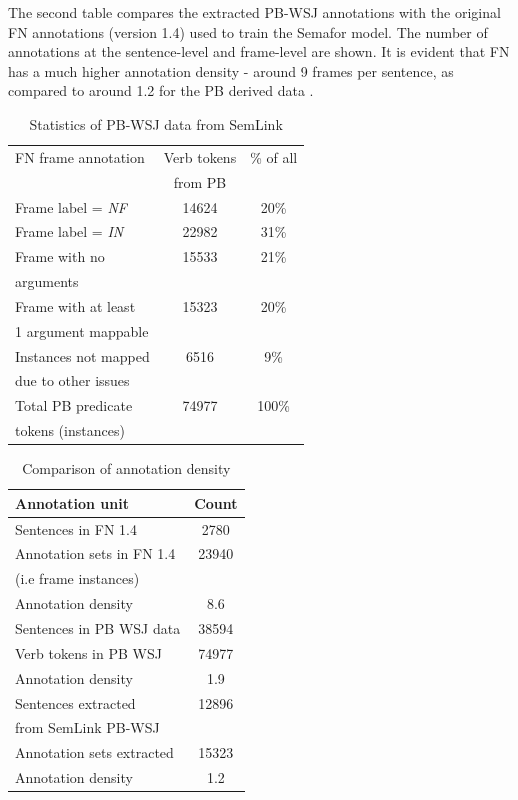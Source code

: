 \documentclass[11pt]{article}
\begin{document}
The second table compares the extracted PB-WSJ annotations with the original FN annotations (version 1.4) used to train the Semafor model. The number of annotations at the sentence-level and frame-level are shown. It is evident that FN has a much higher annotation density - around 9 frames per sentence, as compared to around 1.2 for the PB derived data .


\begin{table}
\caption{Statistics of PB-WSJ data from SemLink}
\label{tab:wsjstats}
\begin{tabular}{|l|c|c|} \hline
FN frame annotation & Verb tokens & \% of all \\
& from PB & \\ \hline \hline
Frame label = \textit{NF} & 14624 & 20\%\\ \hline
Frame label = \textit{IN} & 22982 & 31\% \\ \hline
Frame with no & 15533 & 21\% \\ 
arguments  & & \\\hline
Frame with at least & 15323 & 20\% \\ 
1 argument mappable & & \\ \hline
Instances not mapped & 6516 & 9\% \\ 
due to other issues & & \\ \hline \hline
Total PB predicate & 74977 & 100\% \\
tokens (instances) & & \\ \hline
\end{tabular}
\end{table}

\begin{table}
\caption{Comparison of annotation density}
\begin{tabular}{|l|c|} \hline
\label{tab:annoUnit}
Annotation unit & Count \\\hline \hline
Sentences in FN 1.4 & 2780 \\ 
Annotation sets in FN 1.4 & 23940 \\ %
(i.e frame instances) & \\ 
Annotation density & 8.6 \\ \hline \hline
Sentences in PB WSJ data &  38594 \\ 
Verb tokens in PB WSJ & 74977 \\ 
Annotation density &  1.9 \\\hline \hline
Sentences extracted & 12896 \\ 
from SemLink PB-WSJ & \\ 
Annotation sets extracted & 15323\\ 
Annotation density & 1.2 \\ \hline 
\end{tabular}
\end{table}
\end{document}
